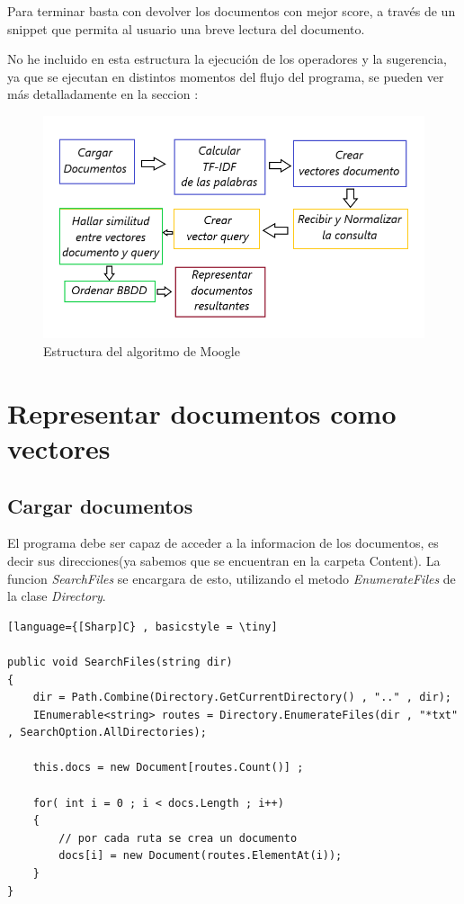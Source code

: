 \documentclass{article}
\begin{document}
Para terminar basta con devolver los documentos con mejor score, a través de un snippet que permita al usuario una breve lectura del documento.

No he incluido en esta estructura la ejecución de los operadores y la sugerencia, ya que se ejecutan en distintos momentos del flujo del programa, se pueden ver más 
detalladamente en la seccion : %

\begin{center}
    
\begin{figure}[ht]
    \label{fig : struct}
    \includegraphics[width = 12cm]{./../images/struct.png}
    \caption{Estructura del algoritmo de Moogle}
\end{figure}
\end{center}

\newpage

\section{Representar documentos como vectores} \label{sec : vectores doc}

\subsection{Cargar documentos}\label{sec : load docs}
El programa debe ser capaz de acceder a la informacion de los documentos, es decir sus direcciones(ya sabemos que se encuentran en la carpeta Content).
La funcion \textit{SearchFiles} se encargara de esto, utilizando el metodo \textit{EnumerateFiles} de la clase \textit{Directory}.

\begin{lstlisting}[language={[Sharp]C} , basicstyle = \tiny]
    
public void SearchFiles(string dir)
{
    dir = Path.Combine(Directory.GetCurrentDirectory() , ".." , dir);
    IEnumerable<string> routes = Directory.EnumerateFiles(dir , "*txt" , SearchOption.AllDirectories);
        
    this.docs = new Document[routes.Count()] ;
        
    for( int i = 0 ; i < docs.Length ; i++)
    {
        // por cada ruta se crea un documento
        docs[i] = new Document(routes.ElementAt(i));
    }
}

    
\end{lstlisting}
\end{document}
